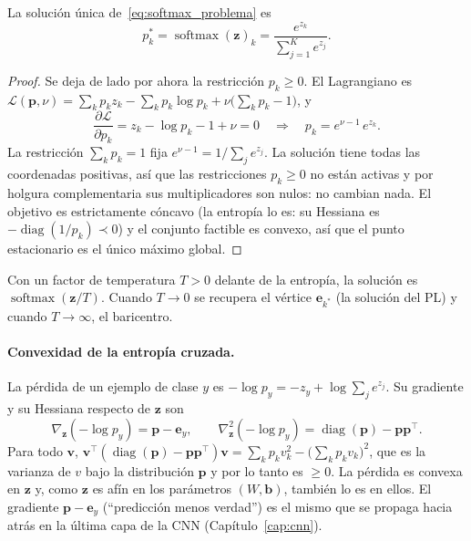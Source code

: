 \begin{proposicion}
La solución única de~\eqref{eq:softmax_problema} es
\begin{equation}
  p_k^* = \operatorname{softmax}(\mathbf{z})_k = \frac{e^{z_k}}{\sum_{j=1}^K e^{z_j}}.
\end{equation}
\end{proposicion}
\begin{proof}
Se deja de lado por ahora la restricción $p_k \ge 0$. El Lagrangiano es
$\mathcal{L}(\mathbf{p}, \nu) = \sum_k p_k z_k - \sum_k p_k\log p_k + \nu\big(\sum_k p_k - 1\big)$, y
\[
  \frac{\partial\mathcal{L}}{\partial p_k} = z_k - \log p_k - 1 + \nu = 0
  \quad\Longrightarrow\quad p_k = e^{\nu - 1}\,e^{z_k}.
\]
La restricción $\sum_k p_k = 1$ fija $e^{\nu-1} = 1/\sum_j e^{z_j}$. La solución tiene todas las coordenadas
positivas, así que las restricciones $p_k \ge 0$ no están activas y por holgura complementaria sus multiplicadores
son nulos: no cambian nada. El objetivo es estrictamente cóncavo (la entropía lo es: su Hessiana es
$-\operatorname{diag}(1/p_k) \prec 0$) y el conjunto factible es convexo, así que el punto estacionario es el único
máximo global.
\end{proof}

Con un factor de temperatura $T > 0$ delante de la entropía, la solución es $\operatorname{softmax}(\mathbf{z}/T)$. Cuando
$T \to 0$ se recupera el vértice $\mathbf{e}_{k^*}$ (la solución del PL) y cuando $T \to \infty$, el baricentro.

\paragraph{Convexidad de la entropía cruzada.} La pérdida de un ejemplo de clase $y$ es
$-\log p_y = -z_y + \log\sum_j e^{z_j}$. Su gradiente y su Hessiana respecto de $\mathbf{z}$ son
\begin{equation}
  \nabla_{\mathbf{z}}(-\log p_y) = \mathbf{p} - \mathbf{e}_y,
  \qquad
  \nabla^2_{\mathbf{z}}(-\log p_y) = \operatorname{diag}(\mathbf{p}) - \mathbf{p}\mathbf{p}^\top.
  \label{eq:grad_ce}
\end{equation}
Para todo $\mathbf{v}$, $\mathbf{v}^\top(\operatorname{diag}(\mathbf{p}) - \mathbf{p}\mathbf{p}^\top)\mathbf{v} = \sum_k p_k v_k^2 - \big(\sum_k p_k v_k\big)^2$,
que es la varianza de $v$ bajo la distribución $\mathbf{p}$ y por lo tanto es $\ge 0$. La pérdida es convexa en
$\mathbf{z}$ y, como $\mathbf{z}$ es afín en los parámetros $(W, \mathbf{b})$, también lo es en ellos. El gradiente
$\mathbf{p} - \mathbf{e}_y$ (``predicción menos verdad'') es el mismo que se propaga hacia atrás en la última capa de la
CNN (Capítulo~\ref{cap:cnn}).

